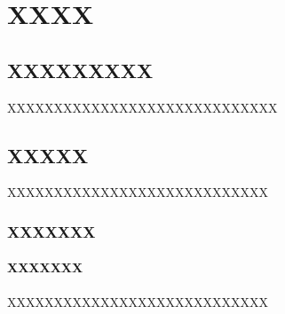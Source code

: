 
\chapter{XXXX}

\section{XXXXXXXXX}

XXXXXXXXXXXXXXXXXXXXXXXXXXXXX

\section{XXXXX}

XXXXXXXXXXXXXXXXXXXXXXXXXXXX

\subsection{XXXXXXX}

\subsubsection{XXXXXXX}

XXXXXXXXXXXXXXXXXXXXXXXXXXXX

